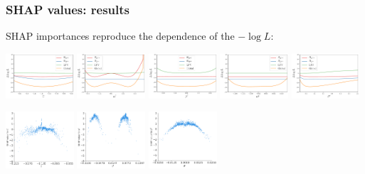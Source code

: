 \documentclass[mathserif, 10pt]{beamer}
\begin{document}
\begin{frame}
    \frametitle{SHAP values: results}
    SHAP importances reproduce the dependence of the $-\log L$:
    \begin{center}
        \includegraphics[width=0.19\textwidth]{figures/evoplot_C.pdf}
        \includegraphics[width=0.19\textwidth]{figures/evoplot_alphal.pdf}
        \includegraphics[width=0.19\textwidth]{figures/evoplot_betal.pdf}
        \includegraphics[width=0.19\textwidth]{figures/evoplot_alphaq.pdf}
        \includegraphics[width=0.19\textwidth]{figures/evoplot_betaq.pdf}
    \end{center}
    \begin{center}
        \includegraphics[width=0.19\textwidth]{figures/SHAP_C.pdf}
        \includegraphics[width=0.19\textwidth]{figures/SHAP_al.pdf}
        \includegraphics[width=0.19\textwidth]{figures/SHAP_bl.pdf}

\end{center}
\end{frame}
\end{document}
